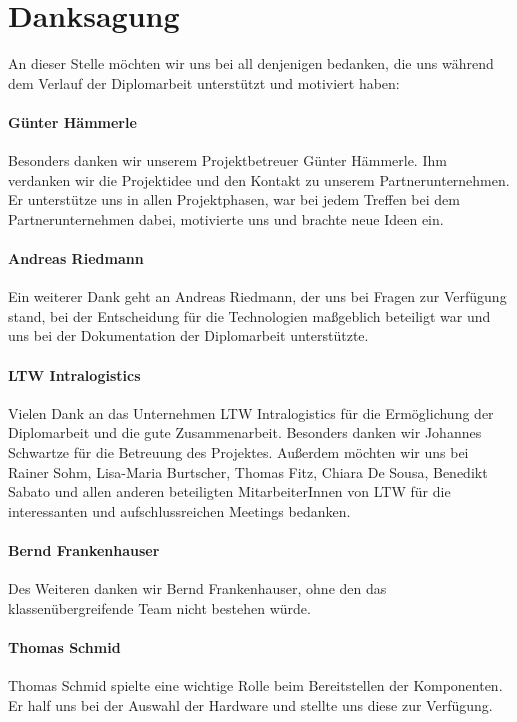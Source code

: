 \section*{Danksagung}

An dieser Stelle möchten wir uns bei all denjenigen bedanken, die uns während dem Verlauf der Diplomarbeit unterstützt und motiviert haben:

\bigskip

\paragraph*{Günter Hämmerle}
Besonders danken wir unserem Projektbetreuer Günter Hämmerle. Ihm verdanken wir die Projektidee und den Kontakt zu unserem Partnerunternehmen. Er unterstütze uns in allen Projektphasen, war bei jedem Treffen bei dem Partnerunternehmen dabei, motivierte uns und brachte neue Ideen ein.

\paragraph*{Andreas Riedmann}
Ein weiterer Dank geht an Andreas Riedmann, der uns bei Fragen zur Verfügung stand, bei der Entscheidung für die Technologien maßgeblich beteiligt war und uns bei der Dokumentation der Diplomarbeit unterstützte.

\paragraph*{LTW Intralogistics}
Vielen Dank an das Unternehmen LTW Intralogistics für die Ermöglichung der Diplomarbeit und die gute Zusammenarbeit. Besonders danken wir Johannes Schwartze für die Betreuung des Projektes. Außerdem möchten wir uns bei Rainer Sohm, Lisa-Maria Burtscher, Thomas Fitz, Chiara De Sousa, Benedikt Sabato und allen anderen beteiligten MitarbeiterInnen von LTW für die interessanten und aufschlussreichen Meetings bedanken.

\paragraph*{Bernd Frankenhauser}
Des Weiteren danken wir Bernd Frankenhauser, ohne den das klassenübergreifende Team nicht bestehen würde.

\paragraph*{Thomas Schmid}
Thomas Schmid spielte eine wichtige Rolle beim Bereitstellen der Komponenten. Er half uns bei der Auswahl der Hardware und stellte uns diese zur Verfügung.

